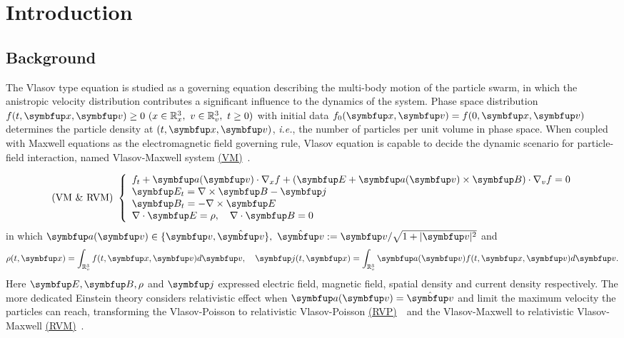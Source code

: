 \newcommand{\eqvp}{\hyperref[eq:vp]{(VP)}~}
\newcommand{\eqvm}{\hyperref[eq:vm]{(VM)}~}
\newcommand{\eqrvp}{\hyperref[eq:vp]{(RVP)}~}                      
\newcommand{\eqrvm}{\hyperref[eq:vm]{(RVM)}~}

\chapter{Introduction}


\section{Background}
The Vlasov type equation is studied as a governing equation describing the multi-body motion of the particle swarm, 
in which the anistropic velocity distribution contributes a significant influence to the dynamics of the system. 
Phase space distribution $\ftxv\geq 0 ~ (x\in \bbRx,~v\in\bbRv,~t\geq 0) $ with initial data $f_{0}(\vx, \vv)=f(0, \vx, \vv)$ determines the particle density at $(t, \vx,\vv)$, \textit{i.e.}, the number of particles per unit volume in phase space. When coupled with Maxwell equations as the electromagnetic field governing rule, Vlasov equation is capable to decide the dynamic 
scenario for particle-field interaction, named Vlasov-Maxwell system \eqvm.


\begin{equation}\label{eq:vm}\text { (VM \& RVM) }\left\{\begin{array}{l}
    f_{t}+\vect{a}(\vv) \cdot \nabla_{x} f+(\vE+\vect{a}(\vv) \times \vB) \cdot \nabla_{v} f=0 \\
    \vE_{t}=\nabla \times \vB-\vect{j} \\
    \vB_{t}=-\nabla \times \vE \\
    \nabla \cdot \vE=\rho, \quad \nabla \cdot \vB=0
    \end{array}\right.\end{equation}
in which $\vect{a}(\vv) \in\{\vv, \hat{\vv}\},~ \hat{\vv}:=\vv / \sqrt{1+|\vv|^{2}}$ and 
\begin{equation}
\rho(t, \vx)=\int_{\bbRv} \ftxv d \vect{v}, \quad \vect{j}(t, \vx)=\int_{\bbRv} \vect{a}(\vv)\ftxv d \vect{v}.
\end{equation}
Here $\vE, \vB, \rho$ and $\vect{j}$ expressed electric field, magnetic field, spatial density and current density respectively. The more dedicated Einstein theory considers relativistic effect when $\vect{a}(\vv)=\hat{\vv}$ and limit the maximum velocity the particles can reach, transforming the Vlasov-Poisson to relativistic Vlasov-Poisson \eqrvp ~and the Vlasov-Maxwell to relativistic Vlasov-Maxwell \eqrvm.

